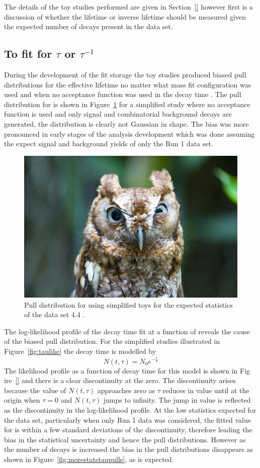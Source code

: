 { The details of the toy studies performed are given in Section~\ref{} however first is a discussion of whether the \bsmumu lifetime or inverse lifetime should be measured given the expected number of decays present in the data set.  

\subsection{To fit for $\tau$ or $\tau^{-1}$}
\label{sec:tauORinvtau}
During the development of the fit storage the toy studies produced biased pull distributions for the \bsmumu effective lifetime no matter what mass fit configuration was used and when no acceptance function was used in the decay time \pdfs. The pull distribution for \tmumu is shown in Figure~\ref{fig:taupulls} for a simplified study where no acceptance function is used and only signal and combinatorial background decays are generated, the distribution is clearly not Gaussian in shape. The bias was more pronounced in early stages of the analysis development which was done assuming the expect signal and background yields of only the Run 1 data set. 

\begin{figure}[htbp]
    \centering
        \includegraphics[width= 0.6 \textwidth]{./Figs/placeholder.jpeg}  
    \caption{Pull distribution for \tmumu using simplified toys for the expected statistics of the data set 4.4 \fb.}
    \label{fig:taupulls}
\end{figure}

The log-likelihood profile of the decay time fit at a function of \tmumu reveals the cause of the biased pull distribution. For the simplified studies illustrated in Figure~\ref{fig:taulike} the decay time is modelled by
\begin{equation}
N(t, \tau) = N_{0}e^{-\frac{t}{\tau}}
\end{equation}
The likelihood profile as a function of decay time for this model is shown in Fig ire~\ref{} and there is a clear discontinuity at the zero. The discontinuity arises because the value of $N(t, \tau)$ approaches zero as $\tau$ reduces in value until at the origin when $\tau = 0$ and $N(t, \tau)$ jumps to infinity. The jump in value is reflected as the discontinuity in the log-likelihood profile. At the low statistics expected for the data set, particularly when only Run 1 data was considered, the fitted value for \tmumu is within a few standard deviations of the discontinuity, therefore leading the bias in the statistical uncertainty and hence the pull distributions. However as the number of \bsmumu decays is increased the bias in the \tmumu pull distributions disappears as shown in Figure~\ref{fig:morestatstaupulls}, as is expected.


}
